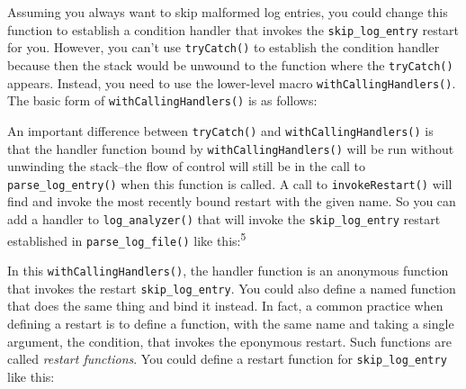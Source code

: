 Assuming you always want to skip malformed log entries, you could change
this function to establish a condition handler that invokes the
\texttt{skip\_log\_entry} restart for you. However, you can't use
\texttt{tryCatch()} to establish the condition handler because then the
stack would be unwound to the function where the \texttt{tryCatch()}
appears. Instead, you need to use the lower-level macro
\texttt{withCallingHandlers()}. The basic form of
\texttt{withCallingHandlers()} is as follows:

\begin{Shaded}
\begin{Highlighting}[]
\NormalTok{(}
   
   
\NormalTok{)}
\end{Highlighting}
\end{Shaded}

An important difference between \texttt{tryCatch()} and
\texttt{withCallingHandlers()} is that the handler function bound by
\texttt{withCallingHandlers()} will be run without unwinding the
stack--the flow of control will still be in the call to
\texttt{parse\_log\_entry()} when this function is called. A call to
\texttt{invokeRestart()} will find and invoke the most recently bound
restart with the given name. So you can add a handler to
\texttt{log\_analyzer()} that will invoke the \texttt{skip\_log\_entry}
restart established in \texttt{parse\_log\_file()} like
this:\textsuperscript{5}

\begin{Shaded}
\begin{Highlighting}[]
\StringTok{ }\NormalTok{() \{}
\StringTok{ }\NormalTok{()}
  
  \NormalTok{(}
     \NormalTok{(}\NormalTok{),}
\NormalTok{  )}
\NormalTok{\}}
\end{Highlighting}
\end{Shaded}

In this \texttt{withCallingHandlers()}, the handler function is an
anonymous function that invokes the restart \texttt{skip\_log\_entry}.
You could also define a named function that does the same thing and bind
it instead. In fact, a common practice when defining a restart is to
define a function, with the same name and taking a single argument, the
condition, that invokes the eponymous restart. Such functions are called
\emph{restart functions}. You could define a restart function for
\texttt{skip\_log\_entry} like this:

